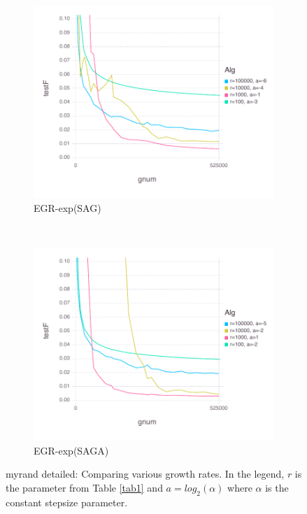 \documentclass[11pt]{article}
\begin{document}
\begin{figure}[H]
          \begin{subfigure}[b]{0.45\textwidth}
              \includegraphics[width=\textwidth]{Figures/myrandBLtrueffFinal-expfalse.pdf}
              \caption{EGR-exp(SAG)}
          \end{subfigure}
          ~ %
            \begin{subfigure}[b]{0.45\textwidth}
                \includegraphics[width=\textwidth]{Figures/myrandBLtrueffFinal-exptrue.pdf}
                \caption{EGR-exp(SAGA)}
            \end{subfigure}
          \caption{myrand detailed: Comparing various growth rates. In the legend, $r$ is the parameter from Table \ref{tab1} and $a=log_2(\alpha)$ where $\alpha$ is the constant stepsize parameter.}\label{fig:myrand}
      \end{figure}
   
\end{document}
